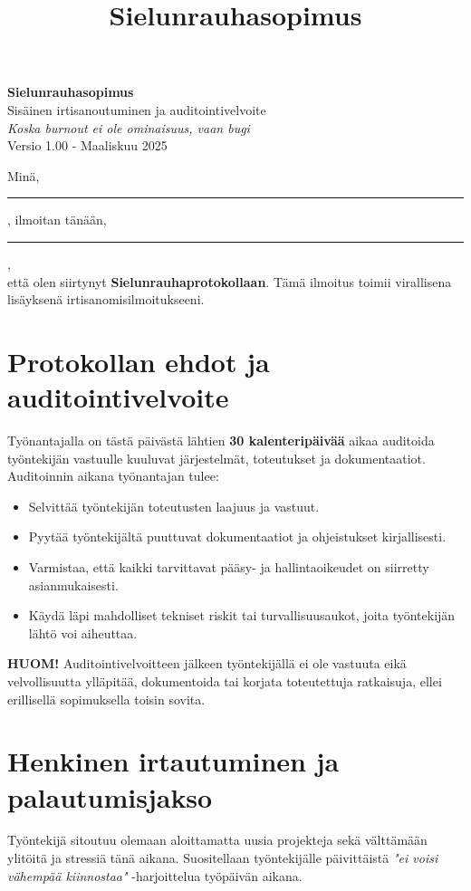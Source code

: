 \documentclass[a4paper,11pt]{article}
\title{Sielunrauhasopimus}
\date{}
\begin{document}
\pagestyle{empty}

\begin{center}
    {\LARGE \textbf{Sielunrauhasopimus}}\\[1em]
    {\large Sisäinen irtisanoutuminen ja auditointivelvoite}\\[0.5em]
    \textit{Koska burnout ei ole ominaisuus, vaan bugi}\\[0.5em]
    {\small Versio 1.00 - Maaliskuu 2025}
\end{center}

\vspace{2em}

Minä, \rule{7cm}{0.2pt}, ilmoitan tänään, \rule{4cm}{0.2pt},\\
että olen siirtynyt \textbf{Sielunrauhaprotokollaan}. Tämä ilmoitus toimii virallisena lisäyksenä irtisanomisilmoitukseeni.

\section*{Protokollan ehdot ja auditointivelvoite}

Työnantajalla on tästä päivästä lähtien \textbf{30 kalenteripäivää} aikaa auditoida työntekijän vastuulle kuuluvat järjestelmät, toteutukset ja dokumentaatiot. Auditoinnin aikana työnantajan tulee:

\begin{itemize}
    \item Selvittää työntekijän toteutusten laajuus ja vastuut.
    \item Pyytää työntekijältä puuttuvat dokumentaatiot ja ohjeistukset kirjallisesti.
    \item Varmistaa, että kaikki tarvittavat pääsy- ja hallintaoikeudet on siirretty asianmukaisesti.
    \item Käydä läpi mahdolliset tekniset riskit tai turvallisuusaukot, joita työntekijän lähtö voi aiheuttaa.
\end{itemize}

\textbf{HUOM!} Auditointivelvoitteen jälkeen työntekijällä ei ole vastuuta eikä velvollisuutta ylläpitää, dokumentoida tai korjata toteutettuja ratkaisuja, ellei erillisellä sopimuksella toisin sovita.

\section*{Henkinen irtautuminen ja palautumisjakso}

Työntekijä sitoutuu olemaan aloittamatta uusia projekteja sekä välttämään ylitöitä ja stressiä tänä aikana. Suositellaan työntekijälle päivittäistä \textit{"ei voisi vähempää kiinnostaa"} -harjoittelua työpäivän aikana.
\end{document}
